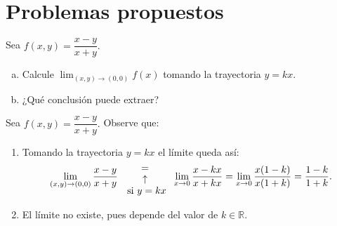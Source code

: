 \section{Problemas propuestos}




\begin{prob}
Sea $f(x,y)=\dfrac{x-y}{x+y}.$
\begin{enumerate}[(a)]
    \item Calcule $\displaystyle\lim_{(x,y)\to (0,0)}f(x)$ tomando la trayectoria $y=kx.$
    \item ¿Qué conclusión puede extraer?
\end{enumerate}
\begin{myproof}
Sea $f(x,y)=\dfrac{x-y}{x+y}.$ Observe que:
\begin{enumerate}[$a)$]
\item Tomando la trayectoria $y=kx$ el límite queda así:
\begin{align*}
\displaystyle\lim_{(x,y)\to (0,0)} \dfrac{x-y}{x+y} {{=}\atop {\begin{array}{c}
\uparrow\\ \text{ si $y=kx$}\end{array}} } \displaystyle\lim_{x\to 0}\dfrac{x-kx}{x+kx}=\displaystyle\lim_{x\to 0}\dfrac{x(1-k)}{x(1+k)}=\dfrac{1-k}{1+k}.
\end{align*}
\item El límite no existe, pues depende del valor de $k\in \mathbb{R}$.
\end{enumerate}
\end{myproof}
\end{prob}

